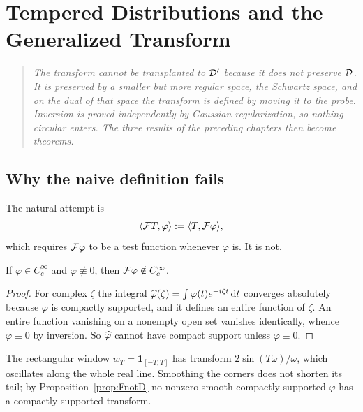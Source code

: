 \chapter{Tempered Distributions and the Generalized Transform}
\label{ch:tespered}

\begin{quote}
\itshape
The transform cannot be transplanted to $\mathcal{D}'$ because it does not preserve $\mathcal{D}$. It is preserved by
a smaller but more regular space, the Schwartz space, and on the dual of that space the transform is
defined by moving it to the probe. Inversion is proved independently by Gaussian regularization, so
nothing circular enters. The three results of the preceding chapters then become theorems.
\end{quote}

\section{Why the naive definition fails}

The natural attempt is
\begin{equation}
\langle \mathcal{F} T,\varphi\rangle:=\langle T,\mathcal{F}\varphi\rangle,
\label{eq:naive}
\end{equation}
which requires $\mathcal{F}\varphi$ to be a test function whenever $\varphi$ is. It is not.

\begin{proposition}\label{prop:FnotD}
If $\varphi\in C_{c}^{\infty}$ and $\varphi\not\equiv0$, then $\mathcal{F}\varphi\notin C_{c}^{\infty}$.
\end{proposition}

\begin{proof}
For complex $\zeta$ the integral $\widehat{\varphi}(\zeta)=\int\varphi(t)e^{-i\zeta t}\,\mathrm{d} t$ converges absolutely
because $\varphi$ is compactly supported, and it defines an entire function of $\zeta$. An entire
function vanishing on a nonempty open set vanishes identically, whence $\varphi\equiv0$ by inversion.
So $\widehat{\varphi}$ cannot have compact support unless $\varphi\equiv0$.
\end{proof}

\begin{example}
The rectangular window $w_{T}=\mathbf{1}_{[-T,T]}$ has transform $2\sin(T\omega)/\omega$, which
oscillates along the whole real line. Smoothing the corners does not shorten its tail; by
Proposition~\ref{prop:FnotD} no nonzero smooth compactly supported $\varphi$ has a compactly supported
transform.
\end{example}

